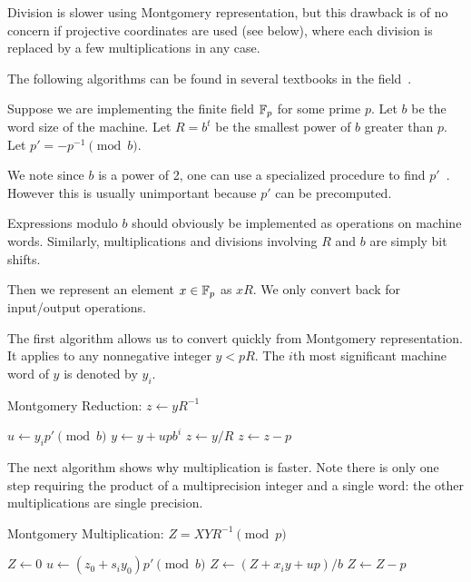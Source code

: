 Division is slower using Montgomery representation, but this drawback is
of no concern if projective coordinates are used (see below),
where each division is replaced by a few multiplications in any case.

The following algorithms can be found in several textbooks in the
field~\cite{bss, handbook}.

Suppose we are implementing the finite field $\mathbb{F}_p$ for some prime $p$.
Let $b$ be the word size of the machine. Let $R = b^t$ be the smallest
power of $b$ greater than $p$. Let $p' = -p^{-1} \pmod b$.

We note since $b$ is a power of 2, one can use a specialized procedure
to find $p'$~\cite[Algorithm II.5]{bss}. However this is usually unimportant
because $p'$ can be precomputed.

Expressions modulo $b$ should obviously be implemented as
operations on machine words. Similarly, multiplications and divisions
involving $R$ and $b$ are simply bit shifts.

Then we represent an element $x\in\mathbb{F}_p$ as $xR$. We only convert back
for input/output operations.

The first algorithm allows us to convert quickly from Montgomery
representation. It applies to any nonnegative integer $y < pR$.
The $i$th most significant machine word of $y$ is
denoted by $y_i$.

\begin{algorithm}
\caption {Montgomery Reduction: $z \gets yR^{-1}$}
\begin{algorithmic}[1]
\STATE $u\gets y_i p' \pmod b$
\STATE $y\gets y + upb^i$
\ENDFOR
\STATE $z\gets y/R$
\STATE $z\gets z-p$
\ENDIF
\end{algorithmic}
\end{algorithm}

The next algorithm shows why multiplication is faster. Note
there is only one step requiring the product of a multiprecision integer
and a single word: the other multiplications are single precision.

\begin{algorithm}
\caption {Montgomery Multiplication: $Z = X Y R^{-1} \pmod p$}
\begin{algorithmic}[1]
\STATE $Z\gets 0$
\STATE $u\gets (z_0 + s_i y_0) p' \pmod b$
\STATE $Z\gets (Z+x_i y + u p)/b$
\ENDFOR
{}
\STATE $Z\gets Z-p$
\ENDIF
\end{algorithmic}
\end{algorithm}

